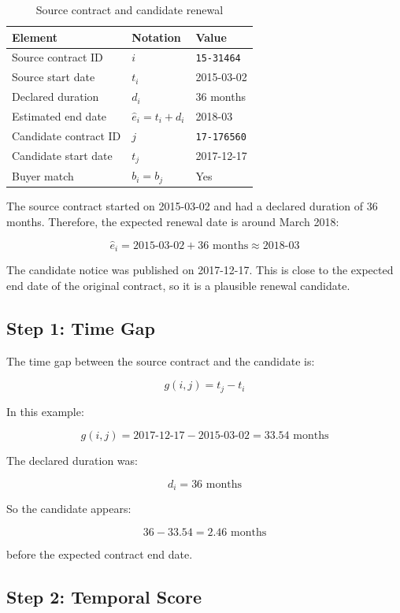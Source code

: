 \documentclass[12pt, a4paper]{article}
\begin{document}
\begin{table}[h]
\centering
\caption{Source contract and candidate renewal}
\begin{tabular}{lll}
\toprule
Element & Notation & Value \\
\midrule
Source contract ID & $i$ & \texttt{15-31464} \\
Source start date & $t_i$ & 2015-03-02 \\
Declared duration & $d_i$ & 36 months \\
Estimated end date & $\hat{e}_i = t_i + d_i$ & 2018-03 \\
Candidate contract ID & $j$ & \texttt{17-176560} \\
Candidate start date & $t_j$ & 2017-12-17 \\
Buyer match & $b_i = b_j$ & Yes \\
\bottomrule
\end{tabular}
\end{table}

The source contract started on 2015-03-02 and had a declared duration of
36 months. Therefore, the expected renewal date is around March 2018:

\[
\hat{e}_i = 2015\text{-}03\text{-}02 + 36 \text{ months}
\approx 2018\text{-}03
\]

The candidate notice was published on 2017-12-17. This is close to the expected
end date of the original contract, so it is a plausible renewal candidate.

\subsection*{Step 1: Time Gap}

The time gap between the source contract and the candidate is:

\[
g(i,j) = t_j - t_i
\]

In this example:

\[
g(i,j)
=
2017\text{-}12\text{-}17
-
2015\text{-}03\text{-}02
=
33.54 \text{ months}
\]

The declared duration was:

\[
d_i = 36 \text{ months}
\]

So the candidate appears:

\[
36 - 33.54 = 2.46 \text{ months}
\]

before the expected contract end date.

\subsection*{Step 2: Temporal Score}
\end{document}
